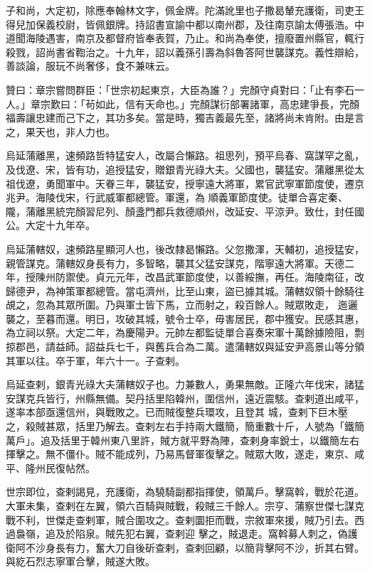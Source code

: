 \begin{pinyinscope}
 子和尚，大定初，除應奉翰林文字，佩金牌。陀滿訛里也子撒曷輦充護衛，司吏王得兒加保義校尉，皆佩銀牌。持詔書宣諭中都以南州郡，及往南京諭太傅張浩。中道聞海陵遇害，南京及都督府皆奉表賀，乃止。和尚為奉使，擅廢置州縣官，輒行殺戮，詔尚書省鞫治之。十九年，詔以義孫引壽為斜魯答阿世襲謀克。義性辯給，善談論，服玩不尚奢侈，食不兼味云。



 贊曰：章宗嘗問群臣：「世宗初起東京，大臣為誰？」完顏守貞對曰：「止有李石一人。」章宗歎曰：「茍如此，信有天命也。」完顏謀衍部署諸軍，高忠建爭長，完顏福壽讓忠建而己下之，其功多矣。當是時，獨吉義最先至，諸將尚未肯附。由是言之，果天也，非人力也。



 烏延蒲離黑，速頻路哲特猛安人，改屬合懶路。祖思列，預平烏春、窩謀罕之亂，及伐遼、宋，皆有功，追授猛安，贈銀青光祿大夫。父國也，襲猛安。蒲離黑從太祖伐遼，勇聞軍中。天眷三年，襲猛安，授寧遠大將軍，累官武寧軍節度使，遷京兆尹。海陵伐宋，行武威軍都總管。軍還，為
 順義軍節度使。徒單合喜定秦、隴，蒲離黑統完顏習尼列、顏盞門都兵救德順州，改延安、平涼尹。致仕，封任國公。大定十九年卒。



 烏延蒲轄奴，速頻路星顯河人也，後改隸曷懶路。父忽撒渾，天輔初，追授猛安，親管謀克。蒲轄奴身長有力，多智略，襲其父猛安謀克，階寧遠大將軍。天德二年，授陳州防禦使。貞元元年，改昌武軍節度使，以善綏撫，再任。海陵南征，改歸德尹，為神策軍都總管。當屯濟州，比至山東，盜已據其城。蒲轄奴領十餘騎往覘之，忽為其眾所圍。乃與軍士皆下馬，立而射之，殺百餘人。賊眾敗走，
 迤邐襲之，至暮而還。明日，攻破其城，號令士卒，毋害居民，郡中獲安。民感其惠，為立祠以祭。大定二年，為慶陽尹。元帥左都監徒單合喜奏宋軍十萬餘據險阻，剽掠郡邑，請益師。詔益兵七千，與舊兵合為二萬。遣蒲轄奴與延安尹高景山等分領其軍以往。卒于軍，年六十一。子查剌。



 烏延查剌，銀青光祿大夫蒲轄奴子也。力兼數人，勇果無敵。正隆六年伐宋，諸猛安謀克兵皆行，州縣無備。契丹括里陷韓州，圍信州，遠近震駭。查剌道出咸平，遂率本部亟還信州，與戰敗之。已而賊復整兵環攻，且登其
 城，查剌下巨木壓之，殺賊甚眾，括里乃解去。查剌左右手持兩大鐵簡，簡重數十斤，人號為「鐵簡萬戶」。追及括里于韓州東八里許，賊方就平野為陣，查剌身率銳士，以鐵簡左右揮擊之。無不僵仆。賊不能成列，乃易馬督軍復擊之。賊眾大敗，遂走，東京、咸平、隆州民復帖然。



 世宗即位，查剌謁見，充護衛，為驍騎副都指揮使，領萬戶。擊窩斡，戰於花道。大軍未集，查剌在左翼，領六百騎與賊戰，殺賊三千餘人。宗亨、蒲察世傑七謀克戰不利，世傑走查剌軍，賊合圍攻之。查剌圜拒而戰，宗敘軍來援，賊乃引去。西過裊嶺，追及於陷泉。賊先犯右翼，查剌迎
 擊之，賊退走。窩斡募人刺之，偽護衛阿不沙身長有力，奮大刀自後斫查剌，查剌回顧，以簡背擊阿不沙，折其右臂。與紇石烈志寧軍合擊，賊遂大敗。




\end{pinyinscope}
